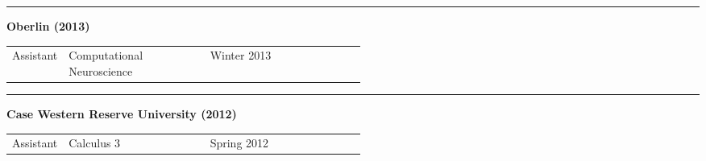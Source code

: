 \documentclass[a4paper,11pt]{article}
\begin{document}
	\noindent\rule{15cm}{0.4pt}
	
	\textbf{Oberlin (2013)}
	
	\begin{tabular}{p{0.11\linewidth}p{0.4\linewidth}p{.2\linewidth}}
		Assistant & Computational Neuroscience  & Winter 2013 
	\end{tabular}
	
	\noindent\rule{15cm}{0.4pt}
	
	\textbf{Case Western Reserve University (2012)}
	
	\begin{tabular}{p{0.11\linewidth}p{0.4\linewidth}p{.2\linewidth}}
		Assistant & Calculus 3  & Spring 2012
	\end{tabular}
	
	
	
\end{document}

